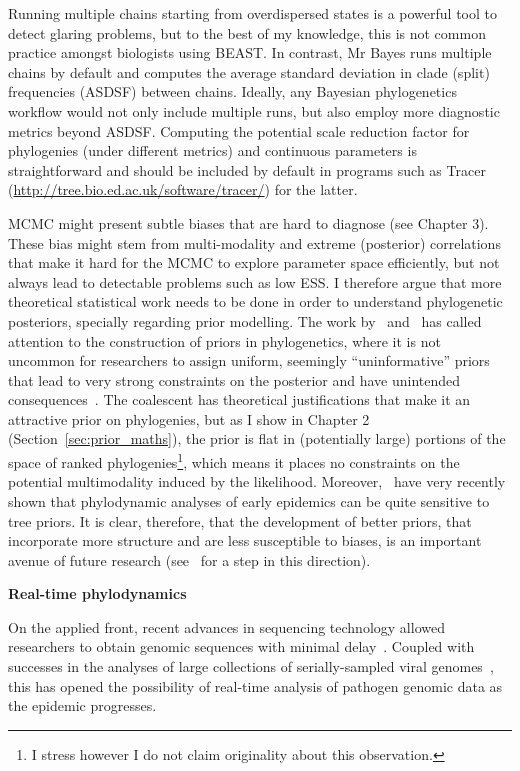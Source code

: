 Running multiple chains starting from overdispersed states is a powerful tool to detect glaring problems, but to the best of my knowledge, this is not common practice amongst biologists using BEAST.
In contrast, Mr Bayes runs multiple chains by default and computes the average standard deviation in clade (split) frequencies (ASDSF) between chains.
Ideally, any Bayesian phylogenetics workflow would not only include multiple runs, but also employ more diagnostic metrics beyond ASDSF.
Computing the potential scale reduction factor for phylogenies (under different metrics) and continuous parameters is straightforward and should be included by default in programs such as Tracer (\url{http://tree.bio.ed.ac.uk/software/tracer/}) for the latter.

MCMC might present subtle biases that are hard to diagnose (see Chapter 3).
These bias might stem from multi-modality and extreme (posterior) correlations that make it hard for the MCMC to explore parameter space efficiently, but not always lead to detectable problems such as low ESS.
I therefore argue that more theoretical statistical work needs to be done in order to understand phylogenetic posteriors, specially regarding prior modelling.
The work by~\cite{Yang2005} and~\cite{Wang2014} has called attention to the construction of priors in phylogenetics, where it is not uncommon for researchers to assign uniform, seemingly ``uninformative'' priors that lead to very strong constraints on the posterior and have unintended consequences~\citep{Seaman2012}.
The coalescent has theoretical justifications that make it an attractive prior on phylogenies, but as I show in Chapter 2 (Section~\ref{sec:prior_maths}), the prior is flat in (potentially large) portions of the space of ranked phylogenies\footnote{I stress however I do not claim originality about this observation.}, which means it places no constraints on the potential multimodality induced by the likelihood.
Moreover,~\cite{Boskova2018} have very recently shown that phylodynamic analyses of early epidemics can be quite sensitive to tree priors.
It is clear, therefore, that the development of better priors, that incorporate more structure and are less susceptible to biases, is an important avenue of future research (see~\cite{Moller2018} for a step in this direction). 

\textbf{Real-time phylodynamics}

On the applied front, recent advances in sequencing technology allowed researchers to obtain genomic sequences with minimal delay~\citep{Quick2016}.
Coupled with successes in the analyses of large collections of serially-sampled viral genomes~\citep{Dudas2017}, this has opened the possibility of real-time analysis of pathogen genomic data as the epidemic progresses.

